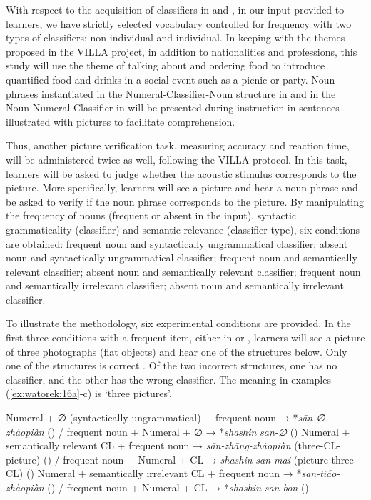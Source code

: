 \documentclass[output=paper,colorlinks,citecolor=brown,modfonts,nonflat]{../langscibook}
\begin{document}
With respect to the acquisition of classifiers in  and , in our input provided to learners, we have strictly selected vocabulary controlled for frequency with two types of classifiers: non-individual and individual. In keeping with the themes proposed in the VILLA project, in addition to nationalities and professions, this study will use the theme of talking about and ordering food to introduce quantified food and drinks in a social event such as a picnic or party. Noun phrases instantiated in the Numeral-Classifier-Noun structure in  and in the Noun-Numeral-Classifier in  will be presented during instruction in sentences illustrated with pictures to facilitate comprehension.

Thus, another picture verification task, measuring accuracy and reaction time, will be administered twice as well, following the VILLA protocol. In this task, learners will be asked to judge whether the acoustic stimulus corresponds to the picture. More specifically, learners will see a picture and hear a noun phrase and be asked to verify if the noun phrase corresponds to the picture. By manipulating the frequency of nouns (frequent or absent in the input), syntactic grammaticality (classifier) and semantic relevance (classifier type), six conditions are obtained: frequent noun and syntactically ungrammatical classifier; absent noun and syntactically ungrammatical classifier; frequent noun and semantically relevant classifier; absent noun and semantically relevant classifier; frequent noun and semantically irrelevant classifier; absent noun and semantically irrelevant classifier.

To illustrate the methodology, six experimental conditions are provided. In the first three conditions with a frequent item, either in  or , learners will see a picture of three photographs (flat objects) and hear one of the structures below. Only one of the structures is correct . Of the two incorrect structures, one has no classifier, and the other has the wrong classifier. The meaning in examples (\ref{ex:watorek:16a}-c) is ‘three pictures’.

\ea%
    \label{ex:watorek:16}
    \ea%
    \label{ex:watorek:16a}
    Numeral + ∅ (syntactically ungrammatical) + frequent noun → *\textit{sān-∅-zhàopiàn} () /  frequent noun + Numeral + ∅  → *\textit{shashin} \textit{san-∅} ()
    \ex%
    \label{ex:watorek:16b}
    Numeral + semantically relevant CL + frequent noun → \textit{sān-zhāng-zhàopiàn} (three-CL-picture) () / frequent noun + Numeral + CL → \textit{shashin} \textit{san-mai} (picture three-CL) ()
    \ex%
    \label{ex:watorek:16c}
    Numeral + semantically irrelevant CL + frequent noun → *\textit{sān-tiáo-zhàopiàn} () / frequent noun + Numeral + CL → *\textit{shashin} \textit{san-bon} ()
    \z
\z
\end{document}
